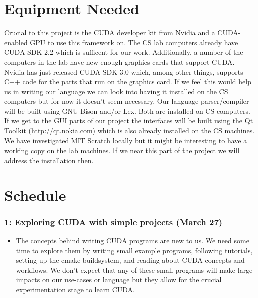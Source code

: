 \documentclass{article}
\begin{document}
\section{Equipment Needed}
Crucial to this project is the CUDA developer kit from Nvidia and a CUDA-enabled GPU to use this framework on. The CS lab computers already have CUDA SDK 2.2 which is sufficent for our work. Additionally, a number of the computers in the lab have new enough graphics cards that support CUDA. Nvidia has just released CUDA SDK 3.0 which, among other things, supports C++ code for the parts that run on the graphics card. If we feel this would help us in writing our language we can look into having it installed on the CS computers but for now it doesn't seem necessary. Our language parser/compiler will be built using GNU Bison and/or Lex. Both are installed on CS computers. If we get to the GUI parts of our project the interfaces will be built using the Qt Toolkit (http://qt.nokia.com) which is also already installed on the CS machines. We have investigated MIT Scratch locally but it might be interesting to have a working copy on the lab machines. If we near this part of the project we will address the installation then.

\section{Schedule}

\subsubsection*{1: Exploring CUDA with simple projects (March 27)}
\begin{itemize}
  \item The concepts behind writing CUDA programs are new to us. We need some time to explore them by writing small example programs, following tutorials, setting up the cmake buildsystem, and reading about CUDA concepts and workflows. We don't expect that any of these small programs will make large impacts on our use-cases or language but they allow for the crucial experimentation stage to learn CUDA.
  \end{itemize}
\end{document}

